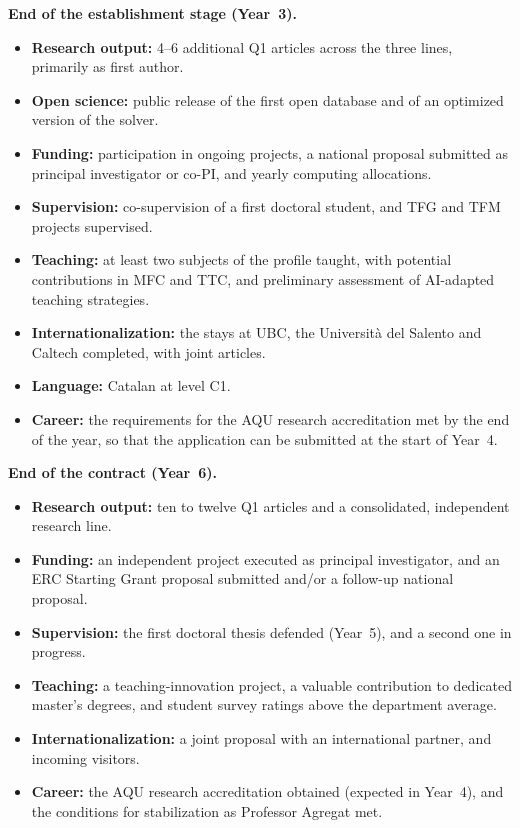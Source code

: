 \documentclass[11pt]{article}
\begin{document}
\noindent\textbf{End of the establishment stage (Year~3).}
\begin{itemize}
  \item \textbf{Research output:} 4--6 additional Q1 articles across the three lines, primarily as first author.
  \item \textbf{Open science:} public release of the first open database and of an optimized version of the solver.
  \item \textbf{Funding:} participation in ongoing projects, a national proposal submitted as principal investigator or co-PI, and yearly computing allocations.
  \item \textbf{Supervision:} co-supervision of a first doctoral student, and TFG and TFM projects supervised.
  \item \textbf{Teaching:} at least two subjects of the profile taught, with potential contributions in MFC and TTC, and preliminary assessment of AI-adapted teaching strategies.
  \item \textbf{Internationalization:} the stays at UBC, the Universit\`a del Salento and Caltech completed, with joint articles.
  \item \textbf{Language:} Catalan at level C1.
  \item \textbf{Career:} the requirements for the AQU research accreditation met by the end of the year, so that the application can be submitted at the start of Year~4.
\end{itemize}

\noindent\textbf{End of the contract (Year~6).}
\begin{itemize}
  \item \textbf{Research output:} ten to twelve Q1 articles and a consolidated, independent research line.
  \item \textbf{Funding:} an independent project executed as principal investigator, and an ERC Starting Grant proposal submitted and/or a follow-up national proposal.
  \item \textbf{Supervision:} the first doctoral thesis defended (Year~5), and a second one in progress.
  \item \textbf{Teaching:} a teaching-innovation project, a valuable contribution to dedicated master's degrees, and student survey ratings above the department average.
  \item \textbf{Internationalization:} a joint proposal with an international partner, and incoming visitors.
  \item \textbf{Career:} the AQU research accreditation obtained (expected in Year~4), and the conditions for stabilization as Professor Agregat met.
\end{itemize}
\end{document}
